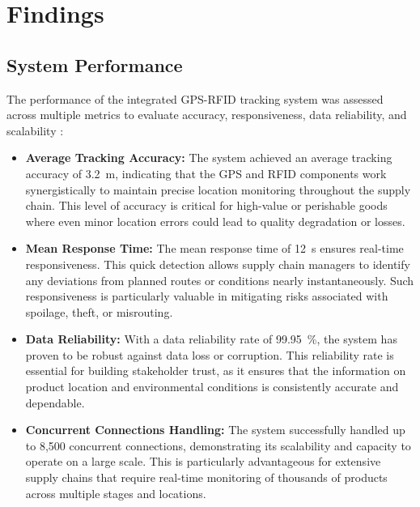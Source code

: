\documentclass[conference]{IEEEtran}
\begin{document}
\section{Findings}

\subsection{System Performance}
The performance of the integrated GPS-RFID tracking system was assessed across multiple metrics to evaluate accuracy, responsiveness, data reliability, and scalability \cite{bhutta2021secure, song2023rfid, makario2021bluetooth, xu2023novel}:

\begin{itemize}
\item \textbf{Average Tracking Accuracy:} The system achieved an average tracking accuracy of \SI{3.2}{\meter}, indicating that the GPS and RFID components work synergistically to maintain precise location monitoring throughout the supply chain. This level of accuracy is critical for high-value or perishable goods where even minor location errors could lead to quality degradation or losses.

\item \textbf{Mean Response Time:} The mean response time of \SI{12}{\second} ensures real-time responsiveness. This quick detection allows supply chain managers to identify any deviations from planned routes or conditions nearly instantaneously. Such responsiveness is particularly valuable in mitigating risks associated with spoilage, theft, or misrouting.

\item \textbf{Data Reliability:} With a data reliability rate of \SI{99.95}{\percent}, the system has proven to be robust against data loss or corruption. This reliability rate is essential for building stakeholder trust, as it ensures that the information on product location and environmental conditions is consistently accurate and dependable.

\item \textbf{Concurrent Connections Handling:} The system successfully handled up to 8,500 concurrent connections, demonstrating its scalability and capacity to operate on a large scale. This is particularly advantageous for extensive supply chains that require real-time monitoring of thousands of products across multiple stages and locations.

\end{itemize}
\end{document}

